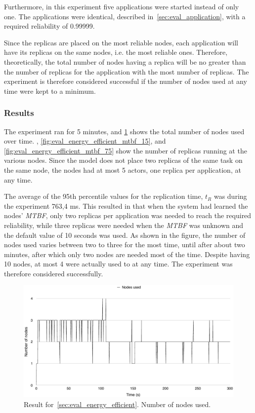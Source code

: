 \documentclass{cslthse-msc}
\begin{document}
Furthermore, in this experiment five applications were started instead of only one. The applications were identical, described in~\cref{sec:eval_application}, with a required reliability of 0.99999.

Since the replicas are placed on the most reliable nodes, each application will have its replicas on the same nodes, i.e. the most reliable ones. Therefore, theoretically, the total number of nodes having a replica will be no greater than the number of replicas for the application with the most number of replicas. The experiment is therefore considered successful if the number of nodes used at any time were kept to a minimum.

\subsubsection*{Results}
The experiment ran for 5 minutes, and \cref{fig:eval_energy_efficient_total} shows the total number of nodes used over time. , \cref{fig:eval_energy_efficient_mtbf_15}, and \cref{fig:eval_energy_efficient_mtbf_75} show the number of replicas running at the various nodes. Since the model does not place two replicas of the same task on the same node, the nodes had at most 5 actors, one replica per application, at any time.

The average of the 95th percentile values for the replication time, $t_R$ was during the experiment 763,4 ms. This resulted in that when the system had learned the nodes' \emph{MTBF}, only two replicas per application was needed to reach the required reliability, while three replicas were needed when the \emph{MTBF} was unknown and the default value of 10 seconds was used. As shown in the figure, the number of nodes used varies between two to three for the most time, until after about two minutes, after which only two nodes are needed most of the time. Despite having 10 nodes, at most 4 were actually used to at any time. The experiment was therefore considered successfully.

\begin{figure}[!hbt]
\centering
\includegraphics[scale=0.5]{images/results/energy_efficient/total.pdf}
\caption[Total number of nodes used in~\cref{sec:eval_energy_efficient}]{Result for~\cref{sec:eval_energy_efficient}. Number of nodes used.} \label{fig:eval_energy_efficient_total}
\end{figure}
\end{document}
